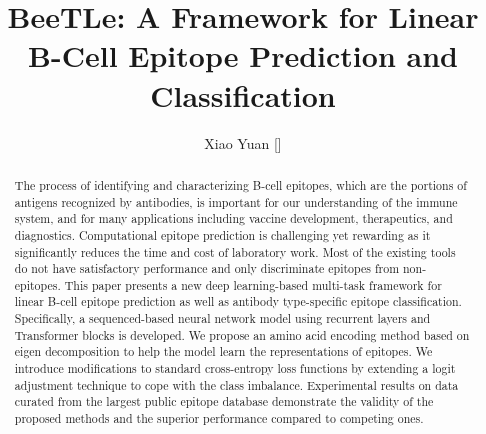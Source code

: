 \documentclass[runningheads]{llncs}
\begin{document}
%
\title{BeeTLe: A Framework for Linear B-Cell Epitope Prediction and Classification}
%
%
\author{Xiao Yuan [\Letter]}
%
%


%
\maketitle              %
%
\begin{abstract}
The process of identifying and characterizing B-cell epitopes, which are the portions of antigens recognized by antibodies, is important for our understanding of the immune system, and for many applications including vaccine development, therapeutics, and diagnostics. Computational epitope prediction is challenging yet rewarding as it significantly reduces the time and cost of laboratory work. Most of the existing tools do not have satisfactory performance and only discriminate epitopes from non-epitopes. This paper presents a new deep learning-based multi-task framework for linear B-cell epitope prediction as well as antibody type-specific epitope classification. Specifically, a sequenced-based neural network model using recurrent layers and Transformer blocks is developed. We propose an amino acid encoding method based on eigen decomposition to help the model learn the representations of epitopes. We introduce modifications to standard cross-entropy loss functions by extending a logit adjustment technique to cope with the class imbalance. Experimental results on data curated from the largest public epitope database demonstrate the validity of the proposed methods and the superior performance compared to competing ones.

\end{abstract}
%
%
%
\end{document}
